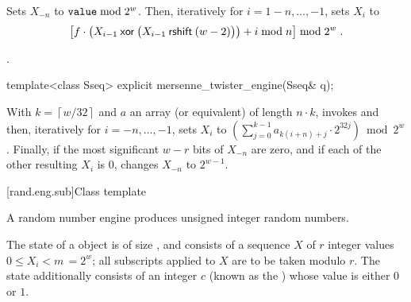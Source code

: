 \begin{itemdescr}
\pnum
\effects
Sets $X_{-n}$ to $\texttt{value} \bmod 2^w$.
Then, iteratively for $i = 1 - n, \dotsc, -1$, sets $X_i$ to
\[%
 \bigl[f \cdot
       \bigl(X_{i-1} \xor \bigl(X_{i-1} \rightshift (w-2)\bigr)
       \bigr)
       + i \bmod n
 \bigr] \bmod 2^w
\; \mbox{.}
\]%

\pnum
\complexity
{}.
\end{itemdescr}

%
\begin{itemdecl}
template<class Sseq> explicit mersenne_twister_engine(Sseq& q);
\end{itemdecl}

\begin{itemdescr}
\pnum
\effects
 With
 $k = \left\lceil w / 32 \right\rceil$
 and $a$ an array (or equivalent)
 of length $n \cdot k$,
 invokes 
 and then, iteratively for $i = -n,\dotsc,-1$,
 sets $X_i$
 to $\left(\sum_{j=0}^{k-1}a_{k(i+n)+j} \cdot 2^{32j} \right) \bmod 2^w$.
 Finally,
 if the most significant $w-r$ bits of $X_{-n}$
 are zero,
 and if each of the other resulting $X_i$ is $0$,
 changes $X_{-n}$
 to $ 2^{w-1} $.
\end{itemdescr}


[rand.eng.sub]{Class template }%
%

\pnum
A  random number engine
produces unsigned integer random numbers.

\pnum
The state%
%
of a  object 
is of size
,
and consists of
a sequence $X$ of $r$ integer values $0 \leq X_i < m \,= 2^w$;
all subscripts applied to $X$ are to be taken modulo $r$.
The state 
additionally consists of an integer $c$
(known as the )%
%
whose value is either $0$ or $1$.

